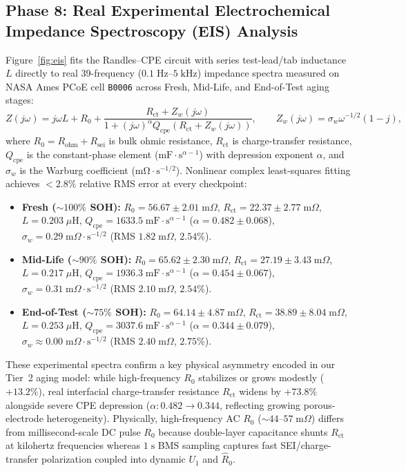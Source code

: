 \documentclass[11pt,a4paper]{article}
\providecommand{\upmu}{\mu}
\begin{document}
\subsection{Phase 8: Real Experimental Electrochemical Impedance Spectroscopy (EIS) Analysis}
Figure~\ref{fig:eis} fits the Randles--CPE circuit with series test-lead/tab inductance $L$ directly to real 39-frequency ($0.1\;\mathrm{Hz}\text{--}5\;\mathrm{kHz}$) impedance spectra measured on NASA Ames PCoE cell \texttt{B0006} across Fresh, Mid-Life, and End-of-Test aging stages:
\begin{equation}\label{eqn:eis_randles}
Z(j\omega) = j\omega L + R_0 + \frac{R_{\text{ct}} + Z_w(j\omega)}{1 + (j\omega)^\alpha Q_{\text{cpe}} \left(R_{\text{ct}} + Z_w(j\omega)\right)}, \qquad Z_w(j\omega) = \sigma_w \omega^{-1/2}(1 - j),
\end{equation}
where $R_0 = R_{\text{ohm}} + R_{\text{sei}}$ is bulk ohmic resistance, $R_{\text{ct}}$ is charge-transfer resistance, $Q_{\text{cpe}}$ is the constant-phase element ($\mathrm{mF}\cdot\mathrm{s}^{\alpha-1}$) with depression exponent $\alpha$, and $\sigma_w$ is the Warburg coefficient ($\mathrm{m\Omega}\cdot\mathrm{s}^{-1/2}$). Nonlinear complex least-squares fitting achieves $<2.8\%$ relative RMS error at every checkpoint:
\begin{itemize}
\item \textbf{Fresh ($\sim 100\%$ SOH):} $R_0 = 56.67 \pm 2.01\;\mathrm{m}\Omega$, $R_{\text{ct}} = 22.37 \pm 2.77\;\mathrm{m}\Omega$, $L = 0.203\;\upmu\mathrm{H}$, $Q_{\text{cpe}} = 1633.5\;\mathrm{mF}\cdot\mathrm{s}^{\alpha-1}$ ($\alpha = 0.482 \pm 0.068$), $\sigma_w = 0.29\;\mathrm{m}\Omega\cdot\mathrm{s}^{-1/2}$ (RMS $1.82\;\mathrm{m}\Omega$, $2.54\%$).
\item \textbf{Mid-Life ($\sim 90\%$ SOH):} $R_0 = 65.62 \pm 2.30\;\mathrm{m}\Omega$, $R_{\text{ct}} = 27.19 \pm 3.43\;\mathrm{m}\Omega$, $L = 0.217\;\upmu\mathrm{H}$, $Q_{\text{cpe}} = 1936.3\;\mathrm{mF}\cdot\mathrm{s}^{\alpha-1}$ ($\alpha = 0.454 \pm 0.067$), $\sigma_w = 0.31\;\mathrm{m}\Omega\cdot\mathrm{s}^{-1/2}$ (RMS $2.10\;\mathrm{m}\Omega$, $2.54\%$).
\item \textbf{End-of-Test ($\sim 75\%$ SOH):} $R_0 = 64.14 \pm 4.87\;\mathrm{m}\Omega$, $R_{\text{ct}} = 38.89 \pm 8.04\;\mathrm{m}\Omega$, $L = 0.253\;\upmu\mathrm{H}$, $Q_{\text{cpe}} = 3037.6\;\mathrm{mF}\cdot\mathrm{s}^{\alpha-1}$ ($\alpha = 0.344 \pm 0.079$), $\sigma_w \approx 0.00\;\mathrm{m}\Omega\cdot\mathrm{s}^{-1/2}$ (RMS $2.40\;\mathrm{m}\Omega$, $2.75\%$).
\end{itemize}
These experimental spectra confirm a key physical asymmetry encoded in our Tier~2 aging model: while high-frequency $R_0$ stabilizes or grows modestly ($+13.2\%$), real interfacial charge-transfer resistance $R_{\text{ct}}$ widens by $+73.8\%$ alongside severe CPE depression ($\alpha: 0.482 \rightarrow 0.344$, reflecting growing porous-electrode heterogeneity). Physically, high-frequency AC $R_0$ ($\sim 44\text{--}57\;\mathrm{m}\Omega$) differs from millisecond-scale DC pulse $R_0$ because double-layer capacitance shunts $R_{\text{ct}}$ at kilohertz frequencies whereas $1\;\mathrm{s}$ BMS sampling captures fast SEI/charge-transfer polarization coupled into dynamic $U_1$ and $\hat{R}_0$.
\end{document}
